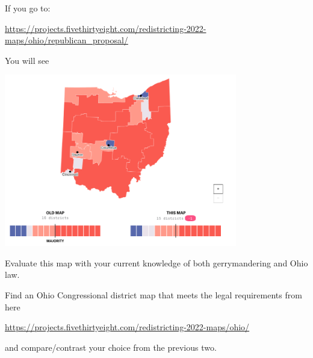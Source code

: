 \documentclass[noauthor,nooutcomes,hints,handout]{ximera}
\begin{document}
\begin{question}
  If you go to:
  \begin{center}
  \url{https://projects.fivethirtyeight.com/redistricting-2022-maps/ohio/republican_proposal/}
  \end{center}
  You will see
  \begin{center}
    \includegraphics[width=4in]{repProp.png}
  \end{center}
  Evaluate this map with your current knowledge of both gerrymandering and Ohio law.
\end{question}


\mynewpage

\begin{question}
  Find an Ohio Congressional district map that meets the legal requirements from here
  \begin{center}
    \url{https://projects.fivethirtyeight.com/redistricting-2022-maps/ohio/}
  \end{center}
  and compare/contrast your choice from the previous two.
\end{question}
\end{document}
